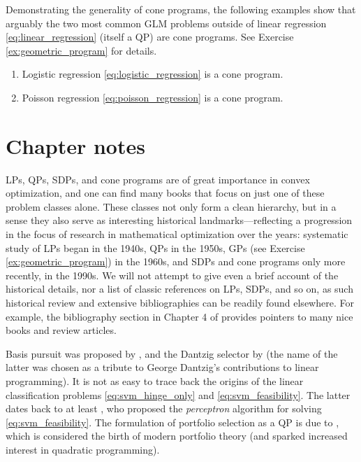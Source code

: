 \begin{Example}
Demonstrating the generality of cone programs, the following examples show that
arguably the two most common GLM problems outside of linear regression
\eqref{eq:linear_regression} (itself a QP) are cone programs. See Exercise
\ref{ex:geometric_program} for details.     

\begin{enumerate}[label=\alph*., ref=\alph*]
\item {}
  Logistic regression \eqref{eq:logistic_regression} is a cone program. 

\item {}
  Poisson regression \eqref{eq:poisson_regression} is a cone program. 
\end{enumerate}
\end{Example}

\SkipTocEntry\section*{Chapter notes}

LPs, QPs, SDPs, and cone programs are of great importance in convex
optimization, and one can find many books that focus on just one of these
problem classes alone. These classes not only form a clean hierarchy, but in a
sense they also serve as interesting historical landmarks---reflecting a
progression in the focus of research in mathematical optimization over the
years: systematic study of LPs began in the 1940s, QPs in the 1950s, GPs (see
Exercise \ref{ex:geometric_program}) in the 1960s, and SDPs and cone programs
only more recently, in the 1990s. We will not attempt to give even a brief
account of the historical details, nor a list of classic references on LPs,
SDPs, and so on, as such historical review and extensive bibliographies can be
readily found elsewhere. For example, the bibliography section in Chapter 4 of
\cite{boyd2004convex} provides pointers to many nice books and review articles. 

Basis pursuit was proposed by \cite{chen1998atomic}, and the Dantzig selector by
\cite{candes2007dantzig} (the name of the latter was chosen as a tribute to
George Dantzig's contributions to linear programming). It is not as easy to
trace back the origins of the linear classification problems
\eqref{eq:svm_hinge_only} and \eqref{eq:svm_feasibility}. The latter dates back
to at least \cite{rosenblatt1958perceptron}, who proposed the \emph{perceptron}
algorithm for solving \eqref{eq:svm_feasibility}. The formulation of portfolio
selection as a QP is due to \cite{markowitz1952portfolio}, which is considered
the birth of modern portfolio theory (and sparked increased interest in
quadratic programming).

